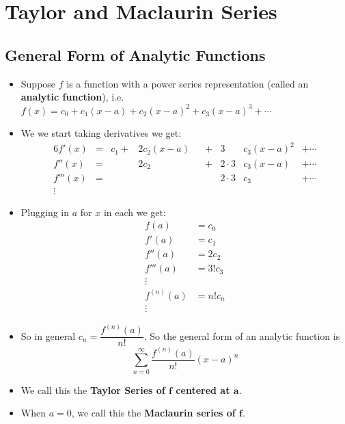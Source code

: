 \documentclass[letterpaper, 11pt, openany]{book}
\theoremstyle{mytheoremstyle}
\theoremstyle{myexamplestyle}
\begin{document}
\section{Taylor and Maclaurin Series}
\setcounter{figure}{0}
\subsection{General Form of Analytic Functions}
\begin{itemize}
    \item Suppose $f$ is a function with a power series representation (called an \textbf{analytic function}), i.e. $f(x) = c_{0} + c_{1} (x - a) + c_{2} (x-a)^{2} + c_{3} (x-a)^{3} + \cdots $
    \item We we start taking derivatives we get:
    \begin{alignat*}{6}
        f'(x)   &=   {}&c_{1}{} +   &2c_{2} (x-a)  &{}   &+  &{}  3&c_{3} (x-a)^{2}    &+ \cdots\\
        f''(x)  &=   {}&{}{}        &2c_{2}        &{}   &+  &{}  2 \cdot 3&c_{3}(x-a) &+ \cdots\\
        f'''(x) &=   {}&{}{}        &{}            &{}   &{} &{}  2 \cdot 3&c_{3}      &+ \cdots\\
        \vdots
    \end{alignat*}
    \item Plugging in $a$ for $x$ in each we get:
    \begin{align*}
        f(a)    &= c_{0} \\
        f'(a)   &= c_{1} \\
        f''(a) &= 2 c_{2} \\
        f'''(a) &= 3! c_{3}\\
        \vdots \\
        f^{(n)}(a) &= n! c_{n}\\
        \vdots
    \end{align*}
    \item So in general $c_{n} = \dfrac{f^{(n)}(a)}{n!}$. So the general form of an analytic function is
    \[\sum_{n=0}^{\infty} \frac{f^{(n)}(a)}{n!} (x-a)^{n}\]
    \item We call this the \textbf{Taylor Series of $\bm{f}$ centered at $\bm{a}$}.
    \item When $a=0$, we call this the \textbf{Maclaurin series of $\bm{f}$}.
\end{itemize}

\end{document}
